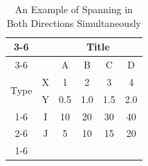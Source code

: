 \begin{table}
	\centering
	\caption{An Example of Spanning in Both Directions Simultaneously}
	\label{mix.spanning}
	\begin{tabular}{cc|c|c|c|c|}
		\cline{3-6}
		& & \multicolumn{4}{|c|}{Title} \\ \cline{3-6}
		& & A & B & C & D \\ \hline
		\multicolumn{1}{|c|}{\multirow{2}{*}{Type}} &
		\multicolumn{1}{|c|}{X} & 1 & 2 & 3 & 4\\ \cline{2-6}
		\multicolumn{1}{|c|}{}                        &
		\multicolumn{1}{|c|}{Y} & 0.5 & 1.0 & 1.5 & 2.0\\ \cline{1-6}
		\multicolumn{1}{|c|}{\multirow{2}{*}{Resource}} &
		\multicolumn{1}{|c|}{I} & 10 & 20 & 30 & 40\\ \cline{2-6}
		\multicolumn{1}{|c|}{}                        &
		\multicolumn{1}{|c|}{J} & 5 & 10 & 15 & 20\\ \cline{1-6}
	\end{tabular}
\end{table}